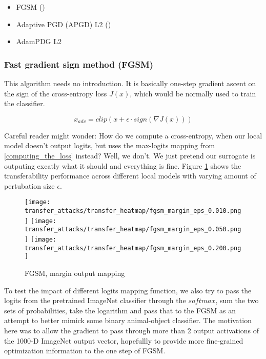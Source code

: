 \begin{itemize}
    \item FGSM (\cite{goodfellow2015explaining})
    \item Adaptive PGD (APGD) L2 (\cite{croce2020reliable})
    \item AdamPDG L2
\end{itemize}


\subsubsection{Fast gradient sign method (FGSM)}
This algorithm needs no introduction.
It is basically one-step gradient ascent on the sign of the cross-entropy loss $J(x)$, which would be normally used to train the classifier.

$$x_{adv} = clip(x + \epsilon \cdot sign(\nabla J(x)))$$


Careful reader might wonder: How do we compute a cross-entropy, when our local model doesn't output logits, but uses the max-logits mapping from \ref{computing_the_loss} instead? Well, we don't. We just pretend our surrogate is outputing excatly what it should and everything is fine. Figure \ref{fig:fgsm_margin} shows the transferability performance across different local models with varying amount of pertubation size $\epsilon$.

\begin{figure}[!htb]
  \texttt{[image: transfer\_attacks/transfer\_heatmap/fgsm\_margin\_eps\_0.010.png]}
\endminipage\hfill
{}
  \texttt{[image: transfer\_attacks/transfer\_heatmap/fgsm\_margin\_eps\_0.050.png]}
\endminipage\hfill
{}%
  \texttt{[image: transfer\_attacks/transfer\_heatmap/fgsm\_margin\_eps\_0.200.png]}
\endminipage
\caption{FGSM, margin output mapping}
\label{fig:fgsm_margin}
\end{figure}

To test the impact of different logits mapping function, we also try to pass the logits from the pretrained ImageNet classifier through the $softmax$, sum the two sets of probabilities, take the logarithm and pass that to the FGSM as an attempt to better mimick some binary animal-object classifier. The motivation here was to allow the gradient to pass through more than 2 output activations of the 1000-D ImageNet output vector, hopefullly to provide more fine-grained optimization information to the one step of FGSM.

